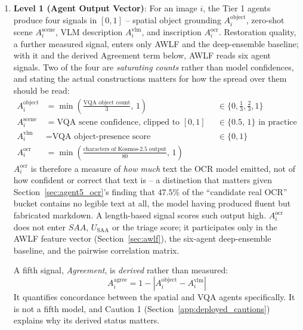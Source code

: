 \documentclass[12pt,a4paper]{report}
\begin{document}
\begin{enumerate}
    \item \textbf{Level 1 (Agent Output Vector)}: For an image $i$, the Tier 1 agents produce four signals in $[0,1]$ -- spatial object grounding $A_i^{\text{object}}$, zero-shot scene $A_i^{\text{scene}}$, VLM description $A_i^{\text{vlm}}$, and inscription $A_i^{\text{ocr}}$. Restoration quality, a further measured signal, enters only AWLF and the deep-ensemble baseline; with it and the derived Agreement term below, AWLF reads six agent signals. Two of the four are \emph{saturating counts} rather than model confidences, and stating the actual constructions matters for how the spread over them should be read:
\begin{equation*}
\begin{aligned}
A_i^{\text{object}} &= \min\!\left(\tfrac{\text{VQA object count}}{3},\, 1\right) && \in \{0,\tfrac13,\tfrac23,1\} \\
A_i^{\text{scene}}  &= \text{VQA scene confidence, clipped to } [0,1] && \in \{0.5,\,1\} \text{ in practice} \\
A_i^{\text{vlm}}    &= \text{VQA object-presence score} && \in \{0,1\} \\
A_i^{\text{ocr}}    &= \min\!\left(\tfrac{\text{characters of Kosmos-2.5 output}}{80},\, 1\right) &&
\end{aligned}
\end{equation*}
$A_i^{\text{ocr}}$ is therefore a measure of \emph{how much} text the OCR model emitted, not of how confident or correct that text is -- a distinction that matters given Section~\ref{sec:agent5_ocr}'s finding that $47.5\%$ of the ``candidate real OCR'' bucket contains no legible text at all, the model having produced fluent but fabricated markdown. A length-based signal scores such output high. $A_i^{\text{ocr}}$ does not enter $SAA$, $U_{\text{SAA}}$ or the triage score; it participates only in the AWLF feature vector (Section~\ref{sec:awlf}), the six-agent deep-ensemble baseline, and the pairwise correlation matrix. 

A fifth signal, \textit{Agreement}, is \emph{derived} rather than measured:
    \begin{equation}
        A_i^{\text{agree}} = 1 - \left|A_i^{\text{object}} - A_i^{\text{vlm}}\right|
        \label{eq:agree}
    \end{equation}
    It quantifies concordance between the spatial and VQA agents specifically. It is not a fifth model, and Caution 1 (Section~\ref{app:deployed_cautions}) explains why its derived status matters.


\end{enumerate}
\end{document}
